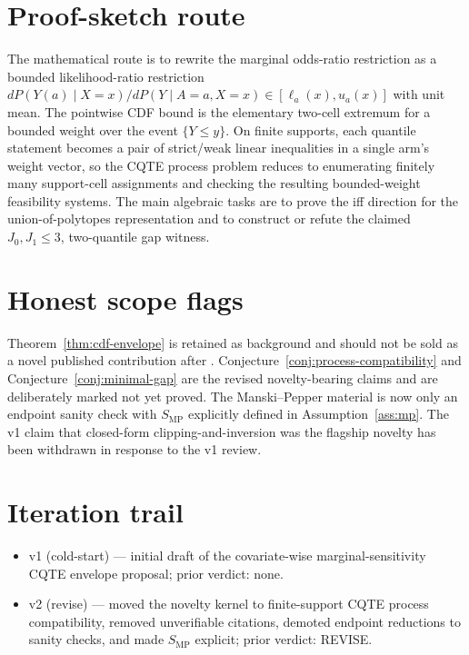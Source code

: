 \documentclass[11pt]{article}
\theoremstyle{definition}
\theoremstyle{plain}
\theoremstyle{remark}
\begin{document}
\section{Proof-sketch route}
The mathematical route is to rewrite the marginal odds-ratio restriction as a bounded likelihood-ratio restriction \(dP(Y(a)\mid X=x)/dP(Y\mid A=a,X=x)\in[\ell_a(x),u_a(x)]\) with unit mean.  The pointwise CDF bound is the elementary two-cell extremum for a bounded weight over the event \(\{Y\le y\}\).  On finite supports, each quantile statement becomes a pair of strict/weak linear inequalities in a single arm's weight vector, so the CQTE process problem reduces to enumerating finitely many support-cell assignments and checking the resulting bounded-weight feasibility systems.  The main algebraic tasks are to prove the iff direction for the union-of-polytopes representation and to construct or refute the claimed \(J_0,J_1\le3\), two-quantile gap witness.

\section{Honest scope flags}
Theorem~\ref{thm:cdf-envelope} is retained as background and should not be sold as a novel published contribution after \citet{MastenPoirierRen2025}.  Conjecture~\ref{conj:process-compatibility} and Conjecture~\ref{conj:minimal-gap} are the revised novelty-bearing claims and are deliberately marked not yet proved.  The Manski--Pepper material is now only an endpoint sanity check with \(S_{\mathrm{MP}}\) explicitly defined in Assumption~\ref{ass:mp}.  The v1 claim that closed-form clipping-and-inversion was the flagship novelty has been withdrawn in response to the v1 review.

\section{Iteration trail}
\begin{itemize}[leftmargin=*]
\item v1 (cold-start) --- initial draft of the covariate-wise marginal-sensitivity CQTE envelope proposal; prior verdict: none.
\item v2 (revise) --- moved the novelty kernel to finite-support CQTE process compatibility, removed unverifiable citations, demoted endpoint reductions to sanity checks, and made \(S_{\mathrm{MP}}\) explicit; prior verdict: REVISE.
\end{itemize}
\end{document}
